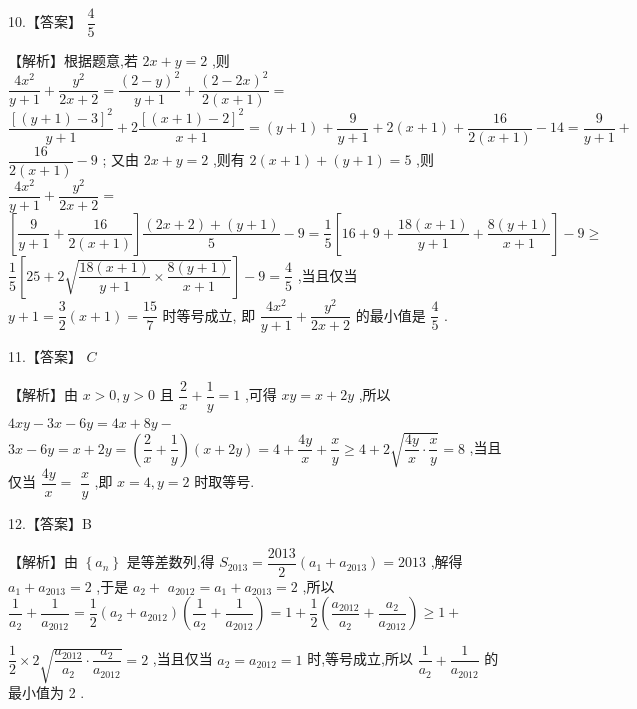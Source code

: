 \documentclass[10pt]{article}
\begin{document}
10.【答案】 $\dfrac{4}{5}$

【解析】根据题意,若 ${2x} + y = 2$ ,则 $\dfrac{4{x}^{2}}{y + 1} + \dfrac{{y}^{2}}{{2x} + 2} = \dfrac{{\left( 2 - y\right) }^{2}}{y + 1} + \dfrac{{\left( 2 - 2x\right) }^{2}}{2\left( {x + 1}\right) } =$  $\dfrac{{\left\lbrack  \left( y + 1\right)  - 3\right\rbrack  }^{2}}{y + 1} + 2\dfrac{{\left\lbrack  \left( x + 1\right)  - 2\right\rbrack  }^{2}}{x + 1} = \left( {y + 1}\right)  + \dfrac{9}{y + 1} + 2\left( {x + 1}\right)  + \dfrac{16}{2\left( {x + 1}\right) } - {14} = \dfrac{9}{y + 1} +$  $\dfrac{16}{2\left( {x + 1}\right) } - 9$ ; 又由 ${2x} + y = 2$ ,则有 $2\left( {x + 1}\right)  + \left( {y + 1}\right)  = 5$ ,则 $\dfrac{4{x}^{2}}{y + 1} + \dfrac{{y}^{2}}{{2x} + 2} =$  $\left\lbrack  {\dfrac{9}{y + 1} + \dfrac{16}{2\left( {x + 1}\right) }}\right\rbrack  \dfrac{\left( {{2x} + 2}\right)  + \left( {y + 1}\right) }{5} - 9 = \dfrac{1}{5}\left\lbrack  {{16} + 9 + \dfrac{{18}\left( {x + 1}\right) }{y + 1} + \dfrac{8\left( {y + 1}\right) }{x + 1}}\right\rbrack   - 9 \geq$  $\dfrac{1}{5}\left\lbrack  {{25} + 2\sqrt{\dfrac{{18}\left( {x + 1}\right) }{y + 1} \times  \dfrac{8\left( {y + 1}\right) }{x + 1}}}\right\rbrack   - 9 = \dfrac{4}{5}$ ,当且仅当 $y + 1 = \dfrac{3}{2}\left( {x + 1}\right)  = \dfrac{15}{7}$ 时等号成立, 即 $\dfrac{4{x}^{2}}{y + 1} + \dfrac{{y}^{2}}{{2x} + 2}$ 的最小值是 $\dfrac{4}{5}$ .

11.【答案】 ${C}$

【解析】由 $x > 0,y > 0$ 且 $\dfrac{2}{x} + \dfrac{1}{y} = 1$ ,可得 ${xy} = x + {2y}$ ,所以 ${4xy} - {3x} - {6y} = {4x} + {8y} -$  ${3x} - {6y} = x + {2y} = \left( {\dfrac{2}{x} + \dfrac{1}{y}}\right) \left( {x + {2y}}\right)  = 4 + \dfrac{4y}{x} + \dfrac{x}{y} \geq  4 + 2\sqrt{\dfrac{4y}{x} \cdot  \dfrac{x}{y}} = 8$ ,当且仅当 $\dfrac{4y}{x} =$  $\dfrac{x}{y}$ ,即 $x = 4,y = 2$ 时取等号.

12.【答案】B

【解析】由 $\left\{  {a}_{n}\right\}$ 是等差数列,得 ${S}_{2013} = \dfrac{2013}{2}\left( {{a}_{1} + {a}_{2013}}\right)  = {2013}$ ,解得 ${a}_{1} + {a}_{2013} = 2$ ,于是 ${a}_{2} +$  ${a}_{2012} = {a}_{1} + {a}_{2013} = 2$ ,所以 $\dfrac{1}{{a}_{2}} + \dfrac{1}{{a}_{2012}} = \dfrac{1}{2}\left( {{a}_{2} + {a}_{2012}}\right) \left( {\dfrac{1}{{a}_{2}} + \dfrac{1}{{a}_{2012}}}\right)  = 1 + \dfrac{1}{2}\left( {\dfrac{{a}_{2012}}{{a}_{2}} + \dfrac{{a}_{2}}{{a}_{2012}}}\right)  \geq  1 +$

$\dfrac{1}{2} \times  2\sqrt{\dfrac{{a}_{2012}}{{a}_{2}} \cdot  \dfrac{{a}_{2}}{{a}_{2012}}} = 2$ ,当且仅当 ${a}_{2} = {a}_{2012} = 1$ 时,等号成立,所以 $\dfrac{1}{{a}_{2}} + \dfrac{1}{{a}_{2012}}$ 的最小值为 2 .
\end{document}
